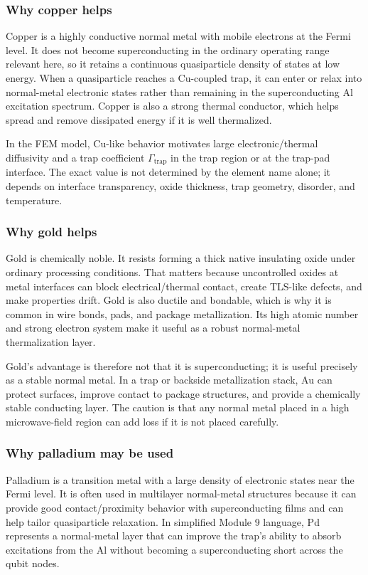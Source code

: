 \documentclass[11pt]{article}
\begin{document}
\subsubsection{Why copper helps}
Copper is a highly conductive normal metal with mobile electrons at the Fermi level. It does not become superconducting in the ordinary operating range relevant here, so it retains a continuous quasiparticle density of states at low energy. When a quasiparticle reaches a Cu-coupled trap, it can enter or relax into normal-metal electronic states rather than remaining in the superconducting Al excitation spectrum. Copper is also a strong thermal conductor, which helps spread and remove dissipated energy if it is well thermalized.

In the FEM model, Cu-like behavior motivates large electronic/thermal diffusivity and a trap coefficient $\Gamma_{\mathrm{trap}}$ in the trap region or at the trap-pad interface. The exact value is not determined by the element name alone; it depends on interface transparency, oxide thickness, trap geometry, disorder, and temperature.

\subsubsection{Why gold helps}
Gold is chemically noble. It resists forming a thick native insulating oxide under ordinary processing conditions. That matters because uncontrolled oxides at metal interfaces can block electrical/thermal contact, create TLS-like defects, and make properties drift. Gold is also ductile and bondable, which is why it is common in wire bonds, pads, and package metallization. Its high atomic number and strong electron system make it useful as a robust normal-metal thermalization layer.

Gold's advantage is therefore not that it is superconducting; it is useful precisely as a stable normal metal. In a trap or backside metallization stack, Au can protect surfaces, improve contact to package structures, and provide a chemically stable conducting layer. The caution is that any normal metal placed in a high microwave-field region can add loss if it is not placed carefully.

\subsubsection{Why palladium may be used}
Palladium is a transition metal with a large density of electronic states near the Fermi level. It is often used in multilayer normal-metal structures because it can provide good contact/proximity behavior with superconducting films and can help tailor quasiparticle relaxation. In simplified Module 9 language, Pd represents a normal-metal layer that can improve the trap's ability to absorb excitations from the Al without becoming a superconducting short across the qubit nodes.
\end{document}
